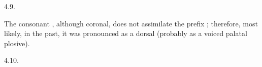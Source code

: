 \begin{refsection}
\begin{practiceproblemsolution}{4.9. \langnameArabic}





The consonant , although coronal, does not assimilate the prefix ; therefore, most likely, in the past, it was
pronounced as a dorsal (probably as a voiced palatal plosive).
\end{practiceproblemsolution}



\begin{practiceproblemsolution}{4.10. \langnameSesotho}

\begin{solutions}[label=Solution 4.10\alph*]
\item \quad


\end{solutions}
\end{practiceproblemsolution}
\end{refsection}
